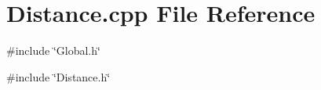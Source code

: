 \section{Distance.cpp File Reference}
\label{Distance_8cpp}
{\ttfamily \#include \char`\"{}Global.h\char`\"{}}\par
{\ttfamily \#include \char`\"{}Distance.h\char`\"{}}\par
